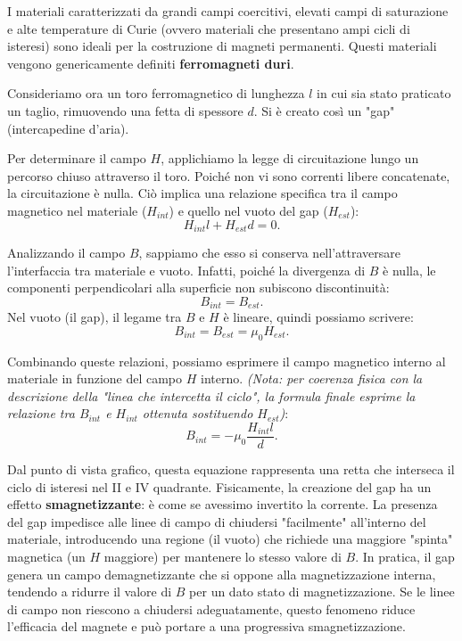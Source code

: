 \documentclass{book}
\begin{document}
I materiali caratterizzati da grandi campi coercitivi, elevati campi di saturazione e alte temperature di Curie (ovvero materiali che presentano ampi cicli di isteresi) sono ideali per la costruzione di magneti permanenti. Questi materiali vengono genericamente definiti \textbf{ferromagneti duri}.

Consideriamo ora un toro ferromagnetico di lunghezza $l$ in cui sia stato praticato un taglio, rimuovendo una fetta di spessore $d$. Si è creato così un "gap" (intercapedine d'aria).

Per determinare il campo $H$, applichiamo la legge di circuitazione lungo un percorso chiuso attraverso il toro. Poiché non vi sono correnti libere concatenate, la circuitazione è nulla.
Ciò implica una relazione specifica tra il campo magnetico nel materiale ($H_{int}$) e quello nel vuoto del gap ($H_{est}$):
$$
H_{int}l + H_{est}d = 0.
$$

Analizzando il campo $B$, sappiamo che esso si conserva nell'attraversare l'interfaccia tra materiale e vuoto. Infatti, poiché la divergenza di $B$ è nulla, le componenti perpendicolari alla superficie non subiscono discontinuità:
$$
B_{int} = B_{est}.
$$
Nel vuoto (il gap), il legame tra $B$ e $H$ è lineare, quindi possiamo scrivere:
$$
B_{int} = B_{est} = \mu_0 H_{est}.
$$

Combinando queste relazioni, possiamo esprimere il campo magnetico interno al materiale in funzione del campo $H$ interno.
\emph{(Nota: per coerenza fisica con la descrizione della "linea che intercetta il ciclo", la formula finale esprime la relazione tra $B_{int}$ e $H_{int}$ ottenuta sostituendo $H_{est}$)}:
$$
B_{int} = -\mu_0 \frac{H_{int}l}{d}.
$$

Dal punto di vista grafico, questa equazione rappresenta una retta che interseca il ciclo di isteresi nel II e IV quadrante.
Fisicamente, la creazione del gap ha un effetto \textbf{smagnetizzante}: è come se avessimo invertito la corrente. La presenza del gap impedisce alle linee di campo di chiudersi "facilmente" all'interno del materiale, introducendo una regione (il vuoto) che richiede una maggiore "spinta" magnetica (un $H$ maggiore) per mantenere lo stesso valore di $B$.
In pratica, il gap genera un campo demagnetizzante che si oppone alla magnetizzazione interna, tendendo a ridurre il valore di $B$ per un dato stato di magnetizzazione. Se le linee di campo non riescono a chiudersi adeguatamente, questo fenomeno riduce l'efficacia del magnete e può portare a una progressiva smagnetizzazione.
\end{document}
